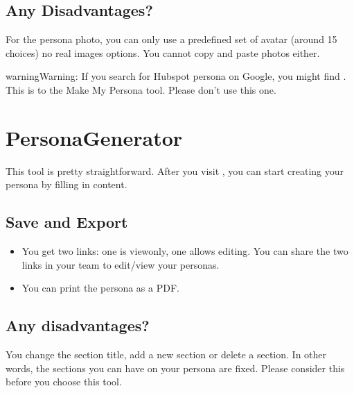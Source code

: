 \documentclass[letterpaper,10pt,english]{jupyterBook}
\begin{document}
\subsection{Any Disadvantages?}
\label{\detokenize{appendices/appendix_c/personas_guide:any-disadvantages}}
\sphinxAtStartPar
For the persona photo, you can only use a pre\sphinxhyphen{}defined set of avatar (around 15 choices) \sphinxhyphen{} no real images options.
You cannot copy and paste photos either.

\begin{sphinxadmonition}{warning}{Warning:}
\sphinxAtStartPar
If you search for Hubspot persona on Google, you might find
.
This is  to the Make My Persona tool. Please don’t use this one.
\end{sphinxadmonition}


\section{PersonaGenerator}
\label{\detokenize{appendices/appendix_c/personas_guide:personagenerator}}
\sphinxAtStartPar
This tool is pretty straight\sphinxhyphen{}forward. After you visit , you can start
creating your persona by filling in content.


\subsection{Save and Export}
\label{\detokenize{appendices/appendix_c/personas_guide:id1}}\begin{itemize}
\item {} 
\sphinxAtStartPar
You get two links: one is view\sphinxhyphen{}only, one allows editing. You can share the two links in your team to edit/view
your personas.

\item {} 
\sphinxAtStartPar
You can print the persona as a PDF.

\end{itemize}


\subsection{Any disadvantages?}
\label{\detokenize{appendices/appendix_c/personas_guide:id2}}
\sphinxAtStartPar
You  change the section title, add a new section or delete a section. In other words, the sections you can
have on your persona are fixed. Please consider this before you choose this tool.
\end{document}
